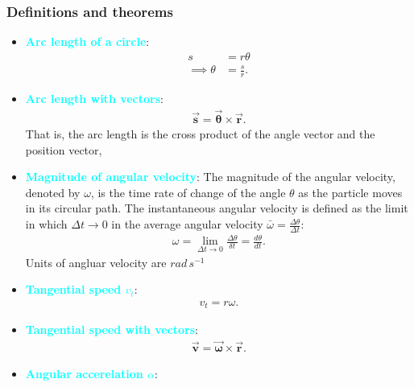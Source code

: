 \documentclass{report}
\begin{document}
    \subsubsection{Definitions and theorems}
    \begin{itemize}
        \item \textbf{\textcolor{cyan}{Arc length of a circle}}:
            \begin{align*}
                s &= r\theta  \\
                \implies \theta  &= \frac{s}{r}
            .\end{align*}
            \bigbreak \noindent 
        \item \textbf{\textcolor{cyan}{Arc length with vectors}}:
            \begin{align*}
                \vec{\mathbf{s}} = \vec{\mathbf{\theta }} \times \vec{\mathbf{r}}
            .\end{align*}
            That is, the arc length is the cross product of the angle vector and the position vector,
            \bigbreak \noindent 
        \item \textbf{\textcolor{cyan}{Magnitude of angular velocity}}:
            The magnitude of the angular velocity, denoted by \(\omega\), is the time rate of change of the angle \(\theta\) as the particle moves in its circular path. The instantaneous angular velocity is defined as the limit in which \(\Delta t \rightarrow 0\) in the average angular velocity \(\bar{\omega} = \frac{\Delta \theta}{\Delta t}\):
            \begin{align*}
                \omega = \lim\limits_{\Delta t \to 0}{\frac{\Delta \theta }{\delta t}} = \frac{d\theta }{dt}
            .\end{align*}
            \bigbreak \noindent 
            Units of angluar velocity are $rad\,s^{-1} $
        \item \textbf{\textcolor{cyan}{Tangential speed $v_{t} $}}:
            \begin{align*}
                v_{t} = r\omega
            .\end{align*}
        \item \textbf{\textcolor{cyan}{Tangential speed with vectors}}:
            \begin{align*}
                \vec{\mathbf{v}} = \vec{\mathbf{\omega}} \times \vec{\mathbf{r}}
            .\end{align*}
        \item \textbf{\textcolor{cyan}{Angular accerelation $\alpha$}}:

\end{itemize}
\end{document}
